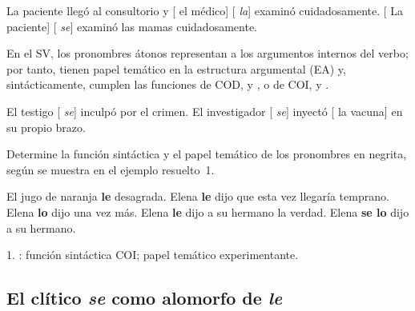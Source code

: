 \begin{exe}
  \ex\label{ex:10-paciente1} La paciente llegó al consultorio y [ el médico] [ \textit{la}] examinó
      cuidadosamente.
  \ex\label{ex:10-paciente2} {}[ La paciente] [ \textit{se}] examinó las mamas cuidadosamente.
\end{exe}

En el SV, los pronombres átonos representan a los argumentos internos del verbo;
por tanto, tienen papel temático en la estructura argumental (EA) y,
sintácticamente, cumplen las funciones de COD,  y
, o de COI,  y
.

\begin{exe}
  \ex\label{ex:10-testigo} El testigo [ \textit{se}] inculpó
      por el crimen.
  \ex\label{ex:10-vacuna} El investigador [ \textit{se}]
      inyectó [ la vacuna] en su propio brazo.
\end{exe}

\begin{ejercicio}\label{ej:10-funcion}
Determine la función sintáctica y el papel temático de los pronombres en
negrita, según se muestra en el ejemplo resuelto~1.

\begin{exe}
  \ex El jugo de naranja \textbf{le} desagrada.
  \ex Elena \textbf{le} dijo que esta vez llegaría temprano.
  \ex Elena \textbf{lo} dijo una vez más.
  \ex Elena \textbf{le} dijo a su hermano la verdad.
  \ex\label{ex:10-selo} Elena \textbf{se lo} dijo a su hermano.
\end{exe}

\begin{resuelto}
1. : función sintáctica COI; papel temático experimentante.
\end{resuelto}
\end{ejercicio}

\subsection{El clítico \textit{se} como alomorfo de \textit{le}}\label{sec:10-alomorfo}

